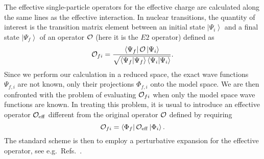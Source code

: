 \begin{multicols}{2}
The effective single-particle operators for the effective charge 
are calculated along the same lines  
as the effective interaction. In   
nuclear transitions, the quantity of 
interest is the transition matrix element between an initial state 
$\left|\Psi_i\right\rangle$ and a final state $\left|\Psi_f\right\rangle$ 
of an operator ${\cal O}$ (here it is the $E2$ operator) defined as 
\begin{equation} 
               {\cal O}_{fi}= 
               \frac{\left\langle\Psi_f\right| 
               {\cal O}\left|\Psi_i\right\rangle } 
               {\sqrt{\left\langle\Psi_f | \Psi_f \right\rangle 
               \left\langle \Psi_i | \Psi_i \right\rangle}}. 
               \label{eq:effop1} 
\end{equation} 
Since we perform our calculation in a reduced space, the exact 
wave functions $\Psi_{f,i}$ are not known, only their 
projections $\Phi_{f,i}$ onto the model space. We are then confronted with the 
problem of evaluating ${\cal O}_{fi}$ when only the model 
space wave functions are known. In treating this problem, it is usual 
to introduce an effective operator 
${\cal O}_{\mathrm{eff}}$ different from the original operator ${\cal O}$ 
defined by requiring 
\begin{equation} 
           {\cal O}_{fi}=\left\langle\Phi_f\right |{\cal O}_{\mathrm{eff}} 
           \left|\Phi_i\right\rangle. 
\end{equation} 
The standard 
scheme is then to employ a  
perturbative expansion for the effective operator, see e.g.\ Refs.\  
\cite{towner87,eo77,kren77}. 
 

\end{multicols}
